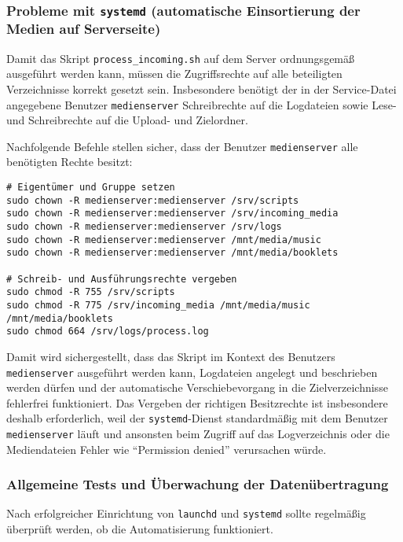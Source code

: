 \documentclass[12pt,a4paper]{report}
\begin{document}
    \subsubsection*{Probleme mit \texttt{systemd} (automatische Einsortierung der Medien auf Serverseite)}
    Damit das Skript \texttt{process\_incoming.sh} auf dem Server ordnungsgemäß ausgeführt werden kann, 
    müssen die Zugriffsrechte auf alle beteiligten Verzeichnisse korrekt gesetzt sein.  
    Insbesondere benötigt der in der Service-Datei angegebene Benutzer \texttt{medienserver} Schreibrechte auf die Logdateien sowie Lese- und Schreibrechte auf die Upload- und Zielordner.

    Nachfolgende Befehle stellen sicher, dass der Benutzer \texttt{medienserver} alle benötigten Rechte besitzt:

    \begin{verbatim}
# Eigentümer und Gruppe setzen
sudo chown -R medienserver:medienserver /srv/scripts
sudo chown -R medienserver:medienserver /srv/incoming_media
sudo chown -R medienserver:medienserver /srv/logs
sudo chown -R medienserver:medienserver /mnt/media/music
sudo chown -R medienserver:medienserver /mnt/media/booklets

# Schreib- und Ausführungsrechte vergeben
sudo chmod -R 755 /srv/scripts
sudo chmod -R 775 /srv/incoming_media /mnt/media/music /mnt/media/booklets
sudo chmod 664 /srv/logs/process.log
    \end{verbatim}

    Damit wird sichergestellt, dass das Skript im Kontext des Benutzers \texttt{medienserver} ausgeführt werden kann, 
    Logdateien angelegt und beschrieben werden dürfen und der automatische Verschiebevorgang in die Zielverzeichnisse fehlerfrei funktioniert.  
    Das Vergeben der richtigen Besitzrechte ist insbesondere deshalb erforderlich, 
    weil der \texttt{systemd}-Dienst standardmäßig mit dem Benutzer \texttt{medienserver} läuft und 
    ansonsten beim Zugriff auf das Logverzeichnis oder die Mediendateien Fehler wie \enquote{Permission denied} verursachen würde.

    \subsubsection*{Allgemeine Tests und Überwachung der Datenübertragung}
    Nach erfolgreicher Einrichtung von \texttt{launchd} und \texttt{systemd} sollte regelmäßig überprüft werden, ob die Automatisierung funktioniert.
\end{document}
